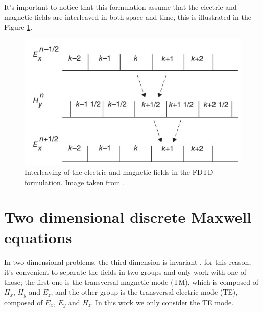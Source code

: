 \documentclass[12pt, oneside]{book}
\begin{document}
It's important to notice that this formulation assume that the electric and magnetic fields are interleaved in both space and time, this is illustrated in the Figure \ref{fig:sullivaninterleaved}.
\begin{figure}[h]
    \centering
    \includegraphics[scale=0.8]{Imagenes/Sullivan_interleaved.jpg}
    \caption{Interleaving of the electric and magnetic fields in the FDTD formulation. Image taken from \cite{Sullivan2020}.}
    \label{fig:sullivaninterleaved}
\end{figure}

\section{Two dimensional discrete Maxwell equations}

In two dimensional problems, the third dimension is invariant \cite{peterson1992electromagnetic}, for this reason, it's convenient to separate the fields in two groups and only work with one of those; the first one is the transversal magnetic mode (TM), which is composed of $H_x$, $H_y$ and $E_z$, and the other group is the transversal electric mode (TE), composed of $E_x$, $E_y$ and $H_z$. In this work we only consider the TE mode.
\end{document}
